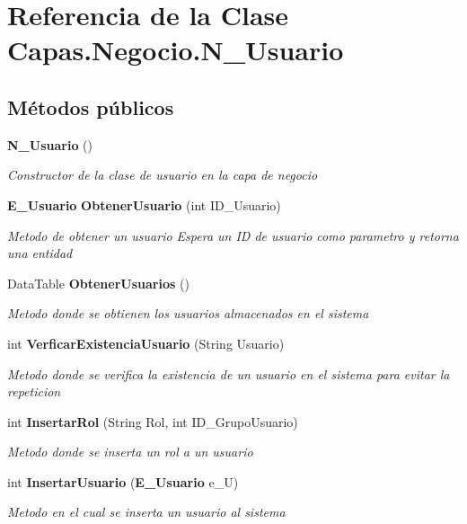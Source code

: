 \section{Referencia de la Clase Capas.\+Negocio.\+N\+\_\+\+Usuario}
\label{class_capas_1_1_negocio_1_1_n___usuario}
\subsection*{Métodos públicos}
\begin{DoxyCompactItemize}
\item 
{\bf N\+\_\+\+Usuario} ()
\begin{DoxyCompactList}\small\item\em Constructor de la clase de usuario en la capa de negocio \end{DoxyCompactList}\item 
{\bf E\+\_\+\+Usuario} {\bf Obtener\+Usuario} (int I\+D\+\_\+\+Usuario)
\begin{DoxyCompactList}\small\item\em Metodo de obtener un usuario Espera un ID de usuario como parametro y retorna una entidad \end{DoxyCompactList}\item 
Data\+Table {\bf Obtener\+Usuarios} ()
\begin{DoxyCompactList}\small\item\em Metodo donde se obtienen los usuarios almacenados en el sistema \end{DoxyCompactList}\item 
int {\bf Verficar\+Existencia\+Usuario} (String Usuario)
\begin{DoxyCompactList}\small\item\em Metodo donde se verifica la existencia de un usuario en el sistema para evitar la repeticion \end{DoxyCompactList}\item 
int {\bf Insertar\+Rol} (String Rol, int I\+D\+\_\+\+Grupo\+Usuario)
\begin{DoxyCompactList}\small\item\em Metodo donde se inserta un rol a un usuario \end{DoxyCompactList}\item 
int {\bf Insertar\+Usuario} ({\bf E\+\_\+\+Usuario} e\+\_\+U)
\begin{DoxyCompactList}\small\item\em Metodo en el cual se inserta un usuario al sistema \end{DoxyCompactList}\item 

\end{DoxyCompactItemize}
